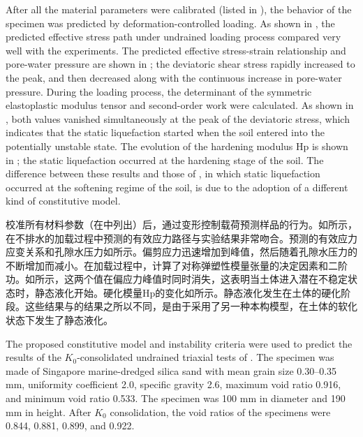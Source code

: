 \begin{ParaColumn}
    After all the material parameters were calibrated (listed in ), the behavior of the specimen was predicted by deformation-controlled loading. As shown in , the predicted effective stress path under undrained loading process compared very well with the experiments. The predicted effective stress-strain relationship and pore-water pressure are shown in ; the deviatoric shear stress rapidly increased to the peak, and then decreased along with the continuous increase in pore-water pressure. During the loading process, the determinant of the symmetric elastoplastic modulus tensor and second-order work were calculated. As shown in , both values vanished simultaneously at the peak of the deviatoric stress, which indicates that the static liquefaction started when the soil entered into the potentially unstable state. The evolution of the hardening modulus Hp is shown in ; the static liquefaction occurred at the hardening stage of the soil. The difference between these results and those of \citet{Andrade2009}, in which static liquefaction occurred at the softening regime of the soil, is due to the adoption of a different kind of constitutive model.

    \switchcolumn

    校准所有材料参数（在中列出）后，通过变形控制载荷预测样品的行为。如所示，在不排水的加载过程中预测的有效应力路径与实验结果非常吻合。预测的有效应力应变关系和孔隙水压力如所示。偏剪应力迅速增加到峰值，然后随着孔隙水压力的不断增加而减小。在加载过程中，计算了对称弹塑性模量张量的决定因素和二阶功。如所示，这两个值在偏应力峰值时同时消失，这表明当土体进入潜在不稳定状态时，静态液化开始。硬化模量Hp的变化如所示。静态液化发生在土体的硬化阶段。这些结果与\citet{Andrade2009}的结果之所以不同，是由于采用了另一种本构模型，在土体的软化状态下发生了静态液化。

    \CrossColumnText{
        
        
        
    }

    The proposed constitutive model and instability criteria were used to predict the results of the $K_0$-consolidated undrained triaxial tests of \citet{Chu2008}. The specimen was made of Singapore marine-dredged silica sand with mean grain size 0.30–0.35 mm, uniformity coefficient 2.0, specific gravity 2.6, maximum void ratio 0.916, and minimum void ratio 0.533. The specimen was 100 mm in diameter and 190 mm in height. After $K_0$ consolidation, the void ratios of the specimens were 0.844, 0.881, 0.899, and 0.922.


\end{ParaColumn}
